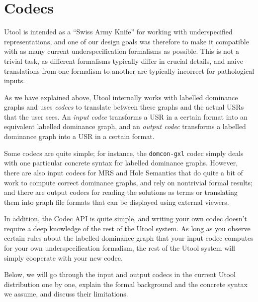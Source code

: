 \section{Codecs}  \label{sec:codecs}


Utool is intended as a ``Swiss Army Knife'' for working with
underspecified representations, and one of our design goals was
therefore to make it compatible with as many current
underspecification formalisms as possible. This is not a trivial task,
as different formalisms typically differ in crucial details, and naive
translations from one formalism to another are typically incorrect for
pathological inputs.

As we have explained above, Utool internally works with labelled
dominance graphs and uses \emph{codecs} to translate between these
graphs and the actual USRs that the user sees. An \emph{input codec}
transforms a USR in a certain format into an equivalent labelled
dominance graph, and an \emph{output codec} transforms a labelled
dominance graph into a USR in a certain format. 

Some codecs are quite simple; for instance, the \verb?domcon-gxl?
codec simply deals with one particular concrete syntax for labelled
dominance graphs. However, there are also input codecs for MRS and
Hole Semantics that do quite a bit of work to compute correct
dominance graphs, and rely on nontrivial formal results; and there are
output codecs for reading the solutions as terms or translating them
into graph file formats that can be displayed using external viewers.

In addition, the Codec API is quite simple, and writing your own codec
doesn't require a deep knowledge of the rest of the Utool system. As
long as you observe certain rules about the labelled dominance graph
that your input codec computes for your own underspecification
formalism, the rest of the Utool system will simply cooperate with
your new codec.

Below, we will go through the input and output codecs in the current
Utool distribution one by one, explain the formal background and the
concrete syntax we assume, and discuss their limitations.



